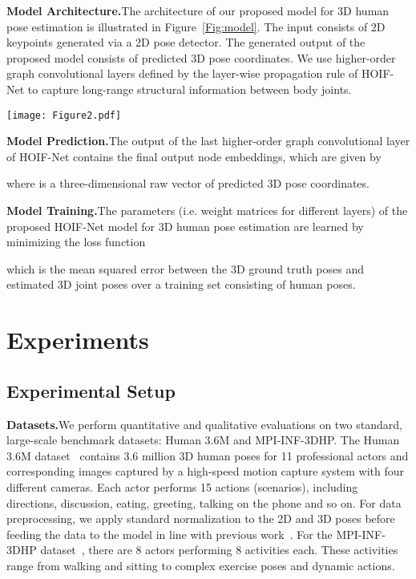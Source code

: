 \documentclass{bmvc2k}
\begin{document}
\medskip\noindent\textbf{Model Architecture.}\quad The architecture of our proposed model for 3D human pose estimation is illustrated in Figure~\ref{Fig:model}. The input consists of 2D keypoints generated via a 2D pose detector. The generated output of the proposed model consists of predicted 3D pose coordinates. We use higher-order graph convolutional layers defined by the layer-wise propagation rule of HOIF-Net to capture long-range structural information between body joints.

\begin{figure*}[!htb]
\centering
\texttt{[image: Figure2.pdf]}
\caption{Overview of the proposed network architecture for 3D pose estimation. Our model takes 2D pose coordinates (17 joints) as input and generates 3D pose predictions (17 joints) as output. We use ten higher-order graph convolutional layers, each of which is followed by batch normalization and ReLU activation function, except the last convolutional layer.}
\label{Fig:model}
\end{figure*}

\medskip\noindent\textbf{Model Prediction.}\quad The output of the last higher-order graph convolutional layer of HOIF-Net contains the final output node embeddings, which are given by

where  is a three-dimensional raw vector of predicted 3D pose coordinates.

\medskip\noindent\textbf{Model Training.}\quad The parameters (i.e. weight matrices for different layers) of the proposed HOIF-Net model for 3D human pose estimation are learned by minimizing the loss function

which is the mean squared error between the 3D ground truth poses  and estimated 3D joint poses  over a training set consisting of  human poses.

\section{Experiments}
\subsection{Experimental Setup}
\medskip\noindent\textbf{Datasets.}\quad We perform quantitative and qualitative evaluations on two standard, large-scale benchmark datasets: Human 3.6M and MPI-INF-3DHP. The Human 3.6M dataset~\cite{ionescu2013human3} contains 3.6 million 3D human poses for 11 professional actors and corresponding images captured by a high-speed motion capture system with four different cameras. Each actor performs 15 actions (scenarios), including directions, discussion, eating, greeting, talking on the phone and so on. For data preprocessing, we apply standard normalization to the 2D and 3D poses before feeding the data to the model in line with previous work~\cite{zou2020high, martinez2017simple}. For the MPI-INF-3DHP dataset~\cite{Dushyant:2017}, there are 8 actors performing 8 activities each. These activities range from walking and sitting to complex exercise poses and dynamic actions.
\end{document}

